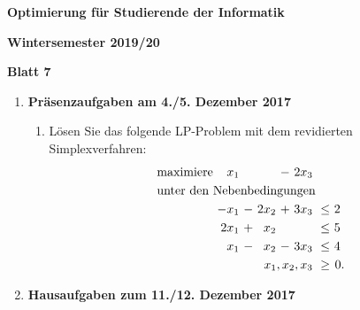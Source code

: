 \documentclass[11pt, a4paper]{article}
\begin{document}
\begin{center}
\begin{Large}
\textbf{Optimierung für Studierende der Informatik}
\end{Large}

\textbf{}
	
\vspace{0.5cm}

\textbf{Wintersemester 2019/20}

\textbf{Blatt 7}

\vspace{0.5cm}
\end{center}

\small

\begin{enumerate}[\bfseries A:]


\item \textbf{Präsenzaufgaben am 4./5. Dezember 2017}

\begin{enumerate}[\bfseries 1.]

\item Lösen Sie das folgende LP-Problem mit dem revidierten Simplexverfahren:
\begin{align*}
\begin{alignedat}{5}
& \text{maximiere } & x_1 &\  &\  &\ - &\ 2x_3 & & \\
& \rlap{unter den Nebenbedingungen} & & & & & & & \\
&& -x_1 &\ - &\ 2x_2 &\ + &\ 3x_3 &\ \leq &\ 2\ \\
&& 2x_1 &\ + &\  x_2 &\   &\      &\ \leq &\ 5\ \\
&&  x_1 &\ - &\  x_2 &\ - &\ 3x_3 &\ \leq &\ 4\ \\
&&&&&& \llap{$x_1,x_2,x_3$} &\ \geq &\ 0.
\end{alignedat}
\end{align*}

\end{enumerate}


\item \textbf{Hausaufgaben zum 11./12. Dezember 2017}


\end{enumerate}
\end{document}

